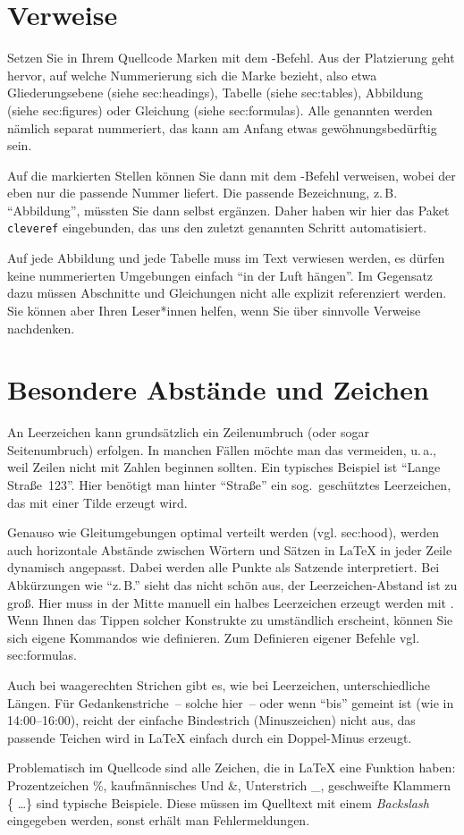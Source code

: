 \section{Verweise}
\label{sec:references}
Setzen Sie in Ihrem Quellcode Marken mit dem -Befehl. Aus der Platzierung geht hervor, auf welche Nummerierung sich die Marke bezieht, also etwa Gliederungsebene (siehe sec:headings), Tabelle (siehe sec:tables), Abbildung (siehe sec:figures) oder Gleichung (siehe sec:formulas). Alle genannten werden nämlich separat nummeriert, das kann am Anfang etwas gewöhnungsbedürftig sein.
\par
Auf die markierten Stellen können Sie dann mit dem -Befehl verweisen, wobei der eben nur die passende Nummer liefert. Die passende Bezeichnung, z.\,B. \enquote{Abbildung}, müssten Sie dann selbst ergänzen. Daher haben wir hier das Paket \texttt{cleveref} eingebunden, das uns den zuletzt genannten Schritt automatisiert.
\par
Auf jede Abbildung und jede Tabelle muss im Text verwiesen werden, es dürfen keine nummerierten Umgebungen einfach \enquote{in der Luft hängen}. Im Gegensatz dazu müssen Abschnitte und Gleichungen nicht alle explizit referenziert werden. Sie können aber Ihren Leser*innen helfen, wenn Sie über sinnvolle Verweise nachdenken.
%
%
\section{Besondere Abstände und Zeichen}
\label{sec:specialCases}
An Leerzeichen kann grundsätzlich ein Zeilenumbruch (oder sogar Seitenumbruch) erfolgen. In manchen Fällen möchte man das vermeiden, u.\,a., weil Zeilen nicht mit Zahlen beginnen sollten. Ein typisches Beispiel ist \enquote{Lange Straße~123}. Hier benötigt man hinter \enquote{Straße} ein sog.\ geschütztes Leerzeichen, das mit einer Tilde erzeugt wird.
\par
Genauso wie Gleitumgebungen optimal verteilt werden (vgl. sec:hood), werden auch horizontale Abstände zwischen Wörtern und Sätzen in \LaTeX{} in jeder Zeile dynamisch angepasst. Dabei werden alle Punkte als Satzende interpretiert. Bei Abkürzungen wie \enquote{z.\,B.} sieht das nicht schön aus, der Leerzeichen-Abstand ist zu groß. Hier muss in der Mitte manuell ein halbes Leerzeichen erzeugt werden mit \comm{,}. Wenn Ihnen das Tippen solcher Konstrukte zu umständlich erscheint, können Sie sich eigene Kommandos wie  definieren. Zum Definieren eigener Befehle vgl. sec:formulas.
\par
Auch bei waagerechten Strichen gibt es, wie bei Leerzeichen, unterschiedliche Längen. Für Gedankenstriche~-- solche hier~-- oder wenn \enquote{bis} gemeint ist (wie in 14:00--16:00), reicht der einfache Bindestrich (Minuszeichen) nicht aus, das passende Teichen wird in \LaTeX{} einfach durch ein Doppel-Minus erzeugt.
\par
Problematisch im Quellcode sind alle Zeichen, die in \LaTeX{} eine Funktion haben: Prozentzeichen \%, kaufmännisches Und \&, Unterstrich \_, geschweifte Klammern \{ \ldots\} sind typische Beispiele. Diese müssen im Quelltext mit einem \emph{Backslash} eingegeben werden, sonst erhält man Fehlermeldungen.
%
